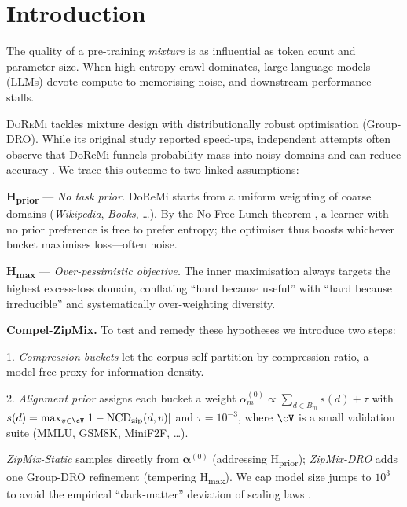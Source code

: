 \section{Introduction}\label{sec:intro}

The quality of a pre-training \emph{mixture} is as influential as token count and parameter size.
When high-entropy crawl dominates, large language models (LLMs) devote compute to memorising noise, and downstream performance stalls.

\textsc{DoReMi} tackles mixture design with distributionally robust optimisation (Group-DRO).
While its original study reported speed-ups, independent attempts often observe that DoReMi funnels probability mass into noisy domains and can reduce accuracy \citep{fan2023doge}.
We trace this outcome to two linked assumptions:

\textbf{H\textsubscript{prior}} — \emph{No task prior.} DoReMi starts from a uniform weighting of coarse domains (\emph{Wikipedia}, \emph{Books}, …).
By the No-Free-Lunch theorem \citep{wolpert1997no}, a learner with no prior preference is free to prefer entropy; the optimiser thus boosts whichever bucket maximises loss—often noise.

\textbf{H\textsubscript{max}} — \emph{Over-pessimistic objective.} The inner maximisation always targets the highest excess-loss domain, conflating ``hard because useful'' with ``hard because irreducible'' and systematically over-weighting diversity.

\medskip
\textbf{Compel-ZipMix.} To test and remedy these hypotheses we introduce two steps:

1.
\emph{Compression buckets} let the corpus self-partition by compression ratio, a model-free proxy for information density.

2.
\emph{Alignment prior} assigns each bucket a weight $\alpha^{(0)}_m\propto\sum_{d\in B_m}s(d)+\tau$ with $s(d)=\max_{v\in\cV}[1-\text{NCD}_{\text{zip}}(d,v)]$ and $\tau=10^{-3}$, where $\cV$ is a small validation suite (MMLU, GSM8K, MiniF2F, …).

\emph{ZipMix-Static} samples directly from $\boldsymbol{\alpha}^{(0)}$ (addressing H\textsubscript{prior}); \emph{ZipMix-DRO} adds one Group-DRO refinement (tempering H\textsubscript{max}).
We cap model size jumps to $10^{3}$ to avoid the empirical ``dark-matter'' deviation of scaling laws \citep{gpt4report,schaeffer2024predictive}.

